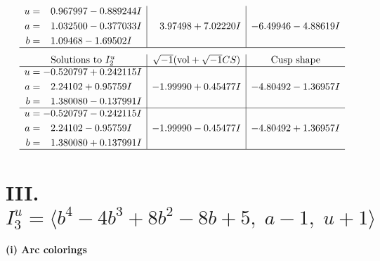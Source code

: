 \documentclass[1p]{elsarticle_modified}
\theoremstyle{definition}
\newcommand{\I}{\sqrt{-1}}
\begin{document}
$$\begin{array}{c|c|c}
\begin{aligned}
u &= \phantom{-}0.967997 - 0.889244 I \\
a &= \phantom{-}1.032500 - 0.377033 I \\
b &= \phantom{-}1.09468 - 1.69502 I\end{aligned}
 & \phantom{-}3.97498 + 7.02220 I & -6.49946 - 4.88619 I\\
 \hline 
 \end{array}$$\newpage$$\begin{array}{c|c|c}  
\text{Solutions to }I^u_{2}& \I (\text{vol} + \sqrt{-1}CS) & \text{Cusp shape}\\
 \hline 
\begin{aligned}
u &= -0.520797 + 0.242115 I \\
a &= \phantom{-}2.24102 + 0.95759 I \\
b &= \phantom{-}1.380080 - 0.137991 I\end{aligned}
 & -1.99990 + 0.45477 I & -4.80492 - 1.36957 I \\ \hline\begin{aligned}
u &= -0.520797 - 0.242115 I \\
a &= \phantom{-}2.24102 - 0.95759 I \\
b &= \phantom{-}1.380080 + 0.137991 I\end{aligned}
 & -1.99990 - 0.45477 I & -4.80492 + 1.36957 I\\
 \hline 
 \end{array}$$\newpage\newpage\renewcommand{\arraystretch}{1}
\centering \section*{III. $I^u_{3}= \langle b^4-4 b^3+8 b^2-8 b+5,\;a-1,\;u+1 \rangle$}
\flushleft \textbf{(i) Arc colorings}\\
\end{document}
